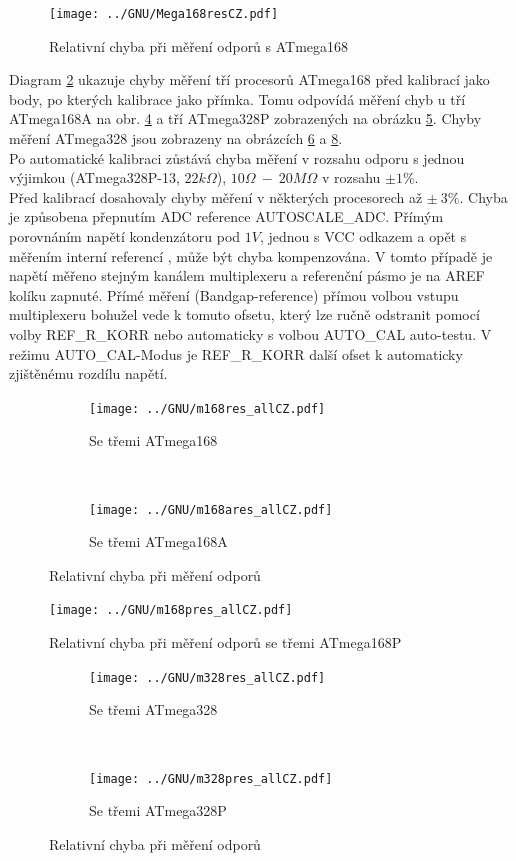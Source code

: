 \begin{figure}[H]
\centering
\texttt{[image: ../GNU/Mega168resCZ.pdf]}
\caption{Relativní chyba při měření odporů s ATmega168}
\label{fig:mega168res}
\end{figure}

Diagram \ref{fig:m168res_all} ukazuje chyby měření tří procesorů ATmega168 před kalibrací jako body, po kterých kalibrace jako přímka. Tomu odpovídá  měření chyb u tří ATmega168A na obr. \ref{fig:m168ares_all} a tří ATmega328P zobrazených na obrázku \ref{fig:m168pres_all}.
Chyby měření ATmega328 jsou zobrazeny na obrázcích \ref{fig:m328res_all} a \ref{fig:m328pres_all}.\\
Po automatické kalibraci zůstává chyba měření v rozsahu odporu s jednou výjimkou (ATmega328P-13, \(22k\Omega\)), 
\(10\Omega~-~20M\Omega\) v rozsahu \(\pm1\%\).\\
Před kalibrací dosahovaly chyby měření v některých procesorech až \(\pm~3\%\).
Chyba je způsobena přepnutím ADC reference AUTOSCALE\_ADC.
Přímým porovnáním napětí kondenzátoru pod \(1V\), jednou s VCC odkazem a opět s měřením interní referencí , může být chyba kompenzována.
V tomto případě je napětí měřeno stejným kanálem multiplexeru a referenční pásmo je na AREF kolíku
zapnuté.
Přímé měření (Bandgap-reference) přímou volbou vstupu multiplexeru bohužel vede k tomuto ofsetu,
který lze ručně odstranit pomocí volby REF\_R\_KORR nebo automaticky s volbou AUTO\_CAL auto-testu.
V režimu AUTO\_CAL-Modus je REF\_R\_KORR další ofset k automaticky zjištěnému rozdílu napětí.

\begin{figure}[H]
  \begin{subfigure}[b]{9cm}
    \centering
    \texttt{[image: ../GNU/m168res\_allCZ.pdf]}
    \caption{Se třemi ATmega168}
    \label{fig:m168res_all}
  \end{subfigure}
  ~
  \begin{subfigure}[b]{9cm}
    \centering
    \texttt{[image: ../GNU/m168ares\_allCZ.pdf]}
    \caption{Se třemi ATmega168A}
    \label{fig:m168ares_all}
  \end{subfigure}
\caption{Relativní chyba při měření odporů}
\end{figure}

\begin{figure}[H]
\centering
\texttt{[image: ../GNU/m168pres\_allCZ.pdf]}
\caption{Relativní chyba při měření odporů se třemi ATmega168P }
\label{fig:m168pres_all}
\end{figure}

\begin{figure}[H]
  \begin{subfigure}[b]{9cm}
    \centering
    \texttt{[image: ../GNU/m328res\_allCZ.pdf]}
    \caption{Se třemi ATmega328}
    \label{fig:m328res_all}
  \end{subfigure}
  ~
  \begin{subfigure}[b]{9cm}
    \centering
    \texttt{[image: ../GNU/m328pres\_allCZ.pdf]}
    \caption{Se třemi ATmega328P}
    \label{fig:m328pres_all}
  \end{subfigure}
\caption{Relativní chyba při měření odporů}
\end{figure}

